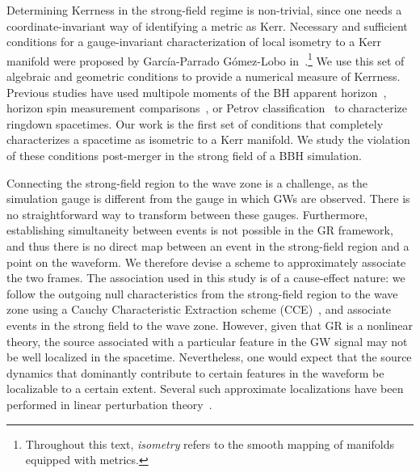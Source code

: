 
Determining Kerrness in the strong-field regime is non-trivial, since one needs a coordinate-invariant way of identifying a metric as Kerr. Necessary and sufficient conditions for a gauge-invariant characterization of local isometry to a Kerr manifold were proposed by Garc\'{i}a-Parrado G\'{o}mez-Lobo in~\cite{lobo16}.\footnote{Throughout this text, \textit{isometry} refers to the smooth mapping of manifolds equipped with metrics.} We use this set of algebraic and geometric conditions to provide a numerical measure of Kerrness. Previous studies have used multipole moments of the BH apparent horizon~\cite{Owen:2009sb}, horizon spin measurement comparisons~\cite{Scheel:2008rj}, or Petrov classification~\cite{Baker,Campanelli:2008dv,Owen:2010vw} to characterize ringdown spacetimes. Our work is the first set of conditions that completely characterizes a spacetime as isometric to a Kerr manifold. We study the violation of these conditions post-merger in the strong field of a BBH simulation.

Connecting the strong-field region to the wave zone is a challenge, as the simulation gauge is different from the gauge in which GWs are observed. There is no straightforward way to transform between these gauges. Furthermore, establishing simultaneity between events is not possible in the GR framework, and thus there is no direct map between an event in the strong-field region and a point on the waveform. We therefore devise a scheme to approximately associate the two frames. The association used in this study is of a cause-effect nature: we follow the outgoing null characteristics from the strong-field region to the wave zone using a Cauchy Characteristic Extraction scheme (CCE)~\cite{Handmer:2014qha, Handmer:2015dsa, Casey}, and associate events in the strong field to the wave zone. However, given that GR is a nonlinear theory, the source associated with a particular feature in the GW signal may not be well localized in the spacetime. Nevertheless, one would expect that the source dynamics that dominantly contribute to certain features in the waveform be localizable to a certain extent. Several such approximate localizations have been performed in linear perturbation theory~\cite{PriceAndPlunge,VitorsECO}. 


